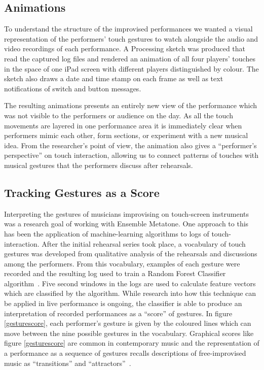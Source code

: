 \documentclass[graybox]{svmult}
\begin{document}
\subsection{Animations}

To understand the structure of the improvised performances we wanted a
visual representation of the performers' touch gestures to watch
alongside the audio and video recordings of each performance. A
Processing sketch was produced that read the captured log files and
rendered an animation of all four players' touches in the space of one
iPad screen with different players distinguished by colour. The sketch
also draws a date and time stamp on each frame as well as text
notifications of switch and button messages.

The resulting animations presents an entirely new view of the
performance which was not visible to the performers or audience on the
day. As all the touch movements are layered in one performance area it
is immediately clear when performers mimic each other, form sections,
or experiment with a new musical idea. From the researcher's point of
view, the animation also gives a ``performer's perspective'' on touch
interaction, allowing us to connect patterns of touches with musical
gestures that the performers discuss after rehearsals.

\subsection{Tracking Gestures as a Score}

Interpreting the gestures of musicians improvising on touch-screen
instruments was a research goal of working with Ensemble Metatone. One
approach to this has been the application of machine-learning
algorithms to logs of touch-interaction. After the initial rehearsal
series took place, a vocabulary of touch gestures was developed from
qualitative analysis of the rehearsals and discussions among the
performers. From this vocabulary, examples of each gesture were
recorded and the resulting log used to train a Random Forest
Classifier algorithm~\cite{Breiman:2001kx}. Five second windows in the
logs are used to calculate feature vectors which are classified by the
algorithm. While research into how this technique can be applied in
live performance is ongoing, the classifier is able to produce an
interpretation of recorded performances as a ``score'' of gestures. In
figure \ref{gesturescore}, each performer's gesture is given by the
coloured lines which can move between the nine possible gestures in
the vocabulary. Graphical scores like figure \ref{gesturescore} are
common in contemporary music and the representation of a performance
as a sequence of gestures recalls descriptions of free-improvised
music as ``transitions'' and ``attractors''~\cite{Stenstrom:2009xy}.
\end{document}
